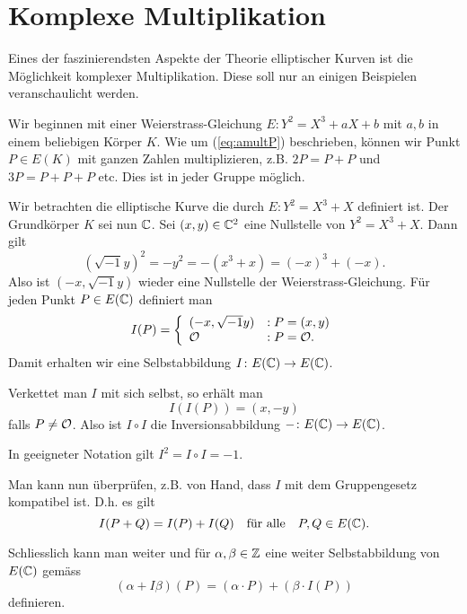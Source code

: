 \chapter{Komplexe Multiplikation}

Eines der faszinierendsten Aspekte der Theorie elliptischer Kurven ist
die Möglichkeit komplexer Multiplikation. Diese soll nur an einigen
Beispielen veranschaulicht werden.

Wir beginnen mit einer Weierstrass-Gleichung $E : Y^2=X^3+aX+b$ mit
$a,b$ in einem beliebigen Körper $K$. Wie um (\ref{eq:amultP}) beschrieben,
können wir Punkt $P\in E(K)$ mit ganzen Zahlen multiplizieren, z.B.
$2P = P+P$ und $3P = P+P+P$ etc. Dies ist  in jeder Gruppe möglich.

\begin{beispiel}
  Wir betrachten die elliptische Kurve die durch  $E: Y^2 = X^3+X$
  definiert ist. Der Grundkörper $K$ sei nun ${\mathbb{C}}$.
  Sei $(x,y)\in{\mathbb{C}}^2$ eine Nullstelle von $Y^2 = X^3+X$. Dann gilt
  \begin{equation*}
    (\sqrt{-1} y)^2 = -y^2 = -(x^3+x) = (-x)^3+(-x). 
  \end{equation*}
  Also ist $(-x,\sqrt{-1}y)$ wieder eine Nullstelle der
  Weierstrass-Gleichung. 
  Für jeden Punkt $P\in E({\mathbb{C}})$ definiert man
  \begin{equation*}
    I(P) = \left\{
      \begin{array}{ll}
        (-x, \sqrt{-1}y)         &: P = (x,y) \\
        {\mathcal O} &: P = {\mathcal O}.
      \end{array}\right.
  \end{equation*}
  Damit erhalten wir eine Selbstabbildung $I\colon E({\mathbb{C}})\rightarrow
  E({\mathbb{C}})$.

  Verkettet man $I$ mit sich selbst, so erhält man 
  \begin{equation*}
    I(I(P)) = (x,-y)
  \end{equation*}
  falls $P\not={\mathcal O}$. Also ist $I\circ I$ die Inversionsabbildung
  $-\colon E({\mathbb{C}})\rightarrow E({\mathbb{C}})$.

  In geeigneter Notation gilt $I^2 = I\circ I = -1$. 

  Man kann nun überprüfen, z.B. von Hand, dass $I$ mit dem
  Gruppengesetz kompatibel ist. D.h. es gilt
  \begin{equation*}
    I(P+Q) = I(P)+I(Q) \quad\text{für alle}\quad P,Q\in E({\mathbb{C}}). 
  \end{equation*}

  Schliesslich kann man weiter und für $\alpha,\beta\in{\mathbb{Z}}$ eine
  weiter Selbstabbildung von $E({\mathbb{C}})$ gemäss
  \begin{equation*}
    (\alpha + I \beta)(P) = (\alpha \cdot P) + (\beta \cdot I(P))
  \end{equation*}
  definieren. 


\end{beispiel}
